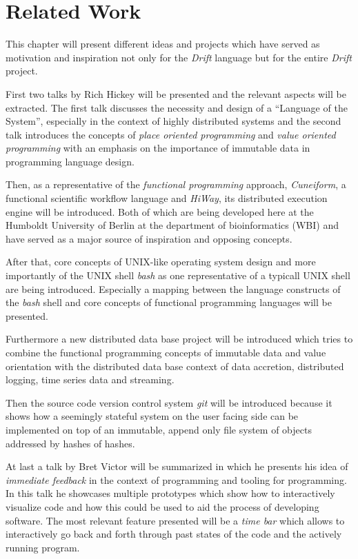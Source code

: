 \section{Related Work}
\label{RelatedWork}

This chapter will present different ideas and projects which have
served as motivation and inspiration not only for the \textit{Drift} language
but for the entire \textit{Drift} project.

First two talks by Rich Hickey will be presented and the relevant
aspects will be extracted. The first talk discusses the necessity
and design of a ``Language of the System'', especially in the
context of highly distributed systems and the second talk
introduces the concepts of \textit{place oriented programming}
and \textit{value oriented programming} with an emphasis on
the importance of immutable data in programming language design.

Then, as a representative of the \textit{functional programming}
approach, \textit{Cuneiform}, a functional scientific workflow language
and \textit{HiWay}, its distributed execution engine
will be introduced. Both of which are being developed here at the
Humboldt University of Berlin at the department of bioinformatics (WBI)
and have served as a major source of inspiration and opposing
concepts.

After that, core concepts of UNIX-like operating system design
and more importantly of the UNIX shell \textit{bash} as one representative
of a typicall UNIX shell are being introduced. Especially a
mapping between the language constructs of the \textit{bash} shell
and core concepts of functional programming languages will be
presented.

Furthermore a new distributed data base project will be introduced
which tries to combine the functional programming concepts of
immutable data and value orientation with the distributed data base
context of data accretion, distributed logging, time series data
and streaming.

Then the source code version control system \textit{git} will
be introduced because it shows how a seemingly stateful system
on the user facing side can be implemented on top of an immutable,
append only file system of objects addressed by hashes of hashes.

At last a talk by Bret Victor will be summarized in which he presents
his idea of \textit{immediate feedback} in the context of programming
and tooling for programming. In this talk he showcases multiple
prototypes which show how to interactively visualize code and how
this could be used to aid the process of developing software.
The most relevant feature presented will be a \textit{time bar}
which allows to interactively go back and forth through past
states of the code and the actively running program.

